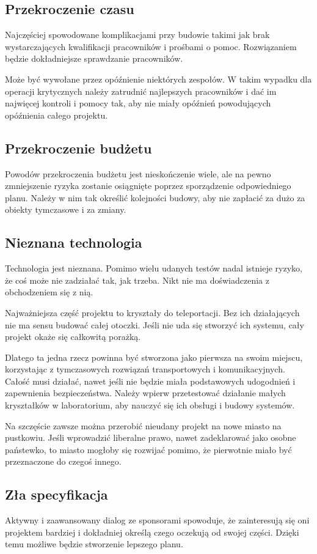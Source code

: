 \subsection{Przekroczenie czasu}
Najczęściej spowodowane komplikacjami przy budowie takimi jak brak wystarczających kwalifikacji pracowników i prośbami o pomoc.
Rozwiązaniem będzie dokładniejsze sprawdzanie pracowników.

Może być wywołane przez opóźnienie niektórych zespołów. 
W takim wypadku dla operacji krytycznych należy zatrudnić najlepszych pracowników i dać im najwięcej kontroli i pomocy tak, aby nie miały opóźnień powodujących opóźnienia całego projektu.

\subsection{Przekroczenie budżetu}
Powodów przekroczenia budżetu jest nieskończenie wiele, ale na pewno zmniejszenie ryzyka zostanie osiągnięte poprzez sporządzenie odpowiedniego planu.
Należy w nim tak określić kolejności budowy, aby nie zapłacić za dużo za obiekty tymczasowe i za zmiany.

\subsection{Nieznana technologia}
Technologia jest nieznana. Pomimo wielu udanych testów nadal istnieje ryzyko, że coś może nie zadziałać tak, jak trzeba. Nikt nie ma doświadczenia z obchodzeniem się z nią.

Najważniejsza część projektu to kryształy do teleportacji. Bez ich działających nie ma sensu budować całej otoczki.
Jeśli nie uda się stworzyć ich systemu, cały projekt okaże się całkowitą porażką.

Dlatego ta jedna rzecz powinna być stworzona jako pierwsza na swoim miejscu, korzystając z tymczasowych rozwiązań transportowych i komunikacyjnych.
Całość musi działać, nawet jeśli nie będzie miała podstawowych udogodnień i zapewnienia bezpieczeństwa.
Należy wpierw przetestować działanie małych kryształków w laboratorium, aby nauczyć się ich obsługi i budowy systemów.

Na szczęście zawsze można przerobić nieudany projekt na nowe miasto na pustkowiu.
Jeśli wprowadzić liberalne prawo, nawet zadeklarować jako osobne państewko, to miasto mogłoby się rozwijać pomimo, że pierwotnie miało być przeznaczone do czegoś innego.

\subsection{Zła specyfikacja}
Aktywny i zaawansowany dialog ze sponsorami spowoduje, że zainteresują się oni projektem bardziej i dokładniej określą czego oczekują od swojej części.
Dzięki temu możliwe będzie stworzenie lepszego planu.

